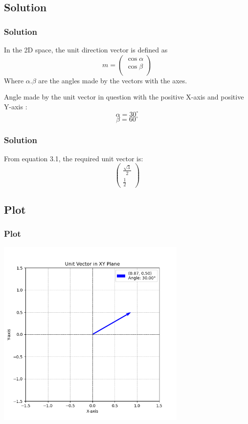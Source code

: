 \documentclass{beamer}
\newcommand{\degree}{^{\circ}}
\theoremstyle{remark}
\numberwithin{equation}{section}
\begin{document}
\subsection{Solution}
\begin{frame}
\frametitle{Solution}

In the 2D space, the unit direction vector is defined as\\
\begin{equation}
    m=\begin{pmatrix}
        \cos\alpha\\
        \cos\beta\\
    \end{pmatrix}
\end{equation}
Where $\alpha.\beta$ are the angles made by the vectors with the axes.

Angle made by the unit vector in question with the positive X-axis and positive Y-axis $\colon$\\
\begin{equation}
    \alpha=30\degree
\end{equation}
\begin{equation}
    \beta=60\degree
\end{equation} 
\end{frame}

\begin{frame}
\frametitle{Solution}

From equation 3.1, the required unit vector is$\colon$
\begin{equation*}
    \begin{pmatrix}
        \frac{\sqrt{3}}{2}\\
        \frac{1}{2}
    \end{pmatrix}
\end{equation*} 
\end{frame}

\subsection{Plot}
\begin{frame}
\frametitle{Plot}
    \begin{center}
\includegraphics[width=0.7\textwidth]{figs/figure1.png}
\end{center}
\end{frame}
\end{document}
